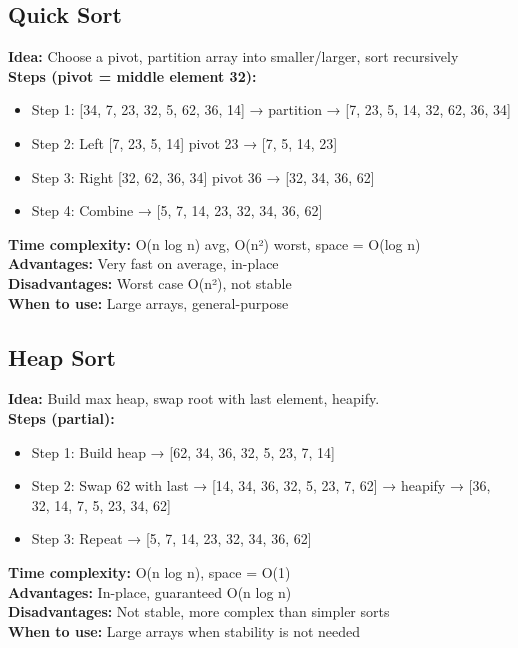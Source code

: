 \documentclass[a4paper,12pt]{article}
\begin{document}
\subsection{Quick Sort}
\textbf{Idea:} Choose a pivot, partition array into smaller/larger, sort recursively  \\
\textbf{Steps (pivot = middle element 32):} 
\begin{itemize}
\item Step 1: [34, 7, 23, 32, 5, 62, 36, 14] → partition → [7, 23, 5, 14, 32, 62, 36, 34]

\item Step 2: Left [7, 23, 5, 14] pivot 23 → [7, 5, 14, 23]

\item Step 3: Right [32, 62, 36, 34] pivot 36 → [32, 34, 36, 62]

\item Step 4: Combine → [5, 7, 14, 23, 32, 34, 36, 62]
\end{itemize}
\textbf{Time complexity:} O(n log n) avg, O(n²) worst, space = O(log n)\\
\textbf{Advantages:} Very fast on average, in-place\\
\textbf{Disadvantages:} Worst case O(n²), not stable\\
\textbf{When to use:} Large arrays, general-purpose
\subsection{Heap Sort}
\textbf{Idea:} Build max heap, swap root with last element, heapify.  \\
\textbf{Steps (partial):}  
\begin{itemize}
\item Step 1: Build heap → [62, 34, 36, 32, 5, 23, 7, 14]

\item Step 2: Swap 62 with last → [14, 34, 36, 32, 5, 23, 7, 62] → heapify → [36, 32, 14, 7, 5, 23, 34, 62]

\item Step 3: Repeat → [5, 7, 14, 23, 32, 34, 36, 62]
\end{itemize}
\textbf{Time complexity:} O(n log n), space = O(1)\\
\textbf{Advantages:} In-place, guaranteed O(n log n)\\
\textbf{Disadvantages:} Not stable, more complex than simpler sorts\\
\textbf{When to use:} Large arrays when stability is not needed
\end{document}
